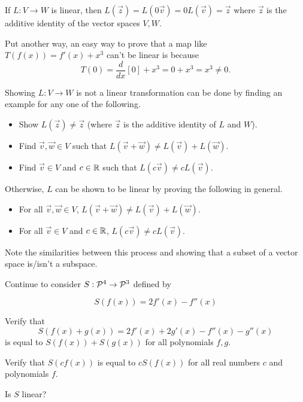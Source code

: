 \begin{fact}
If \(L:V\to W\) is linear, then \(L(\vec z)=L(0\vec v)=0L(\vec v)=\vec z\)
where \(\vec z\) is the additive identity of the vector spaces \(V,W\).

\vspace{1em}

Put another way, an easy way to prove that a map like
\(T(f(x)) = f'(x)+x^3\) can't be linear is because
\[T(0)=\frac{d}{dx}[0]+x^3=0+x^3=x^3\not=0.\]
\end{fact}

\begin{observation}
Showing \(L:V\to W\) is not a linear transformation can be done by finding an example
for any one of the following.

\begin{itemize}
\item Show \(L(\vec z)\not=\vec z\) (where \(\vec z\) is the additive identity of \(L\) and \(W\)).
\item Find \(\vec v,\vec w\in V\) such that \(L(\vec v+\vec w)\not=L(\vec v)+L(\vec w)\).
\item Find \(\vec v\in V\) and \(c\in \IR\) such that \(L(c\vec v)\not=cL(\vec v)\).
\end{itemize}

Otherwise, \(L\) can be shown to be linear by proving the following in general.

\begin{itemize}
\item For all \(\vec v,\vec w\in V\), \(L(\vec v+\vec w)\not=L(\vec v)+L(\vec w)\).
\item For all \(\vec v\in V\) and \(c\in \IR\), \(L(c\vec v)\not=cL(\vec v)\).
\end{itemize}

Note the similarities between this process and showing that a subset of a vector
space is/isn't a subspace. 
\end{observation}

\begin{activity}{15}
Continue to consider \(S: \P^4 \rightarrow \P^3\) defined by

\[S(f(x)) = 2f'(x)-f''(x)\]

\begin{subactivity}
  Verify that
  \[S(f(x)+g(x))=2f'(x)+2g'(x)-f''(x)-g''(x)\]
  is equal to \(S(f(x))+S(g(x))\) for all polynomials \(f,g\).
\end{subactivity}
\begin{subactivity}
  Verify that \(S(cf(x))\) is equal to \(cS(f(x))\) for all real numbers \(c\)
  and polynomials \(f\). 
\end{subactivity}
\begin{subactivity}
  Is \(S\) linear?
\end{subactivity}
\end{activity}


